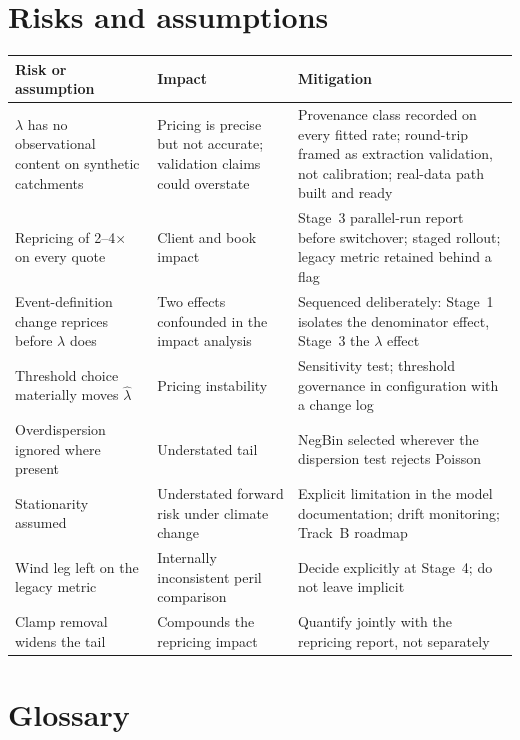 \documentclass[11pt]{article}
\begin{document}
\section{Risks and assumptions}

\begin{longtable}{@{}p{}p{}p{}@{}}
\toprule
\textbf{Risk or assumption} & \textbf{Impact} & \textbf{Mitigation} \\
\midrule
\endhead
$\lambda$ has no observational content on synthetic catchments & Pricing is
precise but not accurate; validation claims could overstate & Provenance class
recorded on every fitted rate; round-trip framed as extraction validation, not
calibration; real-data path built and ready \\
\addlinespace
Repricing of 2--4$\times$ on every quote & Client and book impact & Stage~3
parallel-run report before switchover; staged rollout; legacy metric retained
behind a flag \\
\addlinespace
Event-definition change reprices before $\lambda$ does & Two effects confounded
in the impact analysis & Sequenced deliberately: Stage~1 isolates the
denominator effect, Stage~3 the $\lambda$ effect \\
\addlinespace
Threshold choice materially moves $\hat{\lambda}$ & Pricing instability &
Sensitivity test; threshold governance in configuration with a change log \\
\addlinespace
Overdispersion ignored where present & Understated tail & NegBin selected
wherever the dispersion test rejects Poisson \\
\addlinespace
Stationarity assumed & Understated forward risk under climate change & Explicit
limitation in the model documentation; drift monitoring; Track~B roadmap \\
\addlinespace
Wind leg left on the legacy metric & Internally inconsistent peril comparison &
Decide explicitly at Stage~4; do not leave implicit \\
\addlinespace
Clamp removal widens the tail & Compounds the repricing impact & Quantify
jointly with the repricing report, not separately \\
\bottomrule
\end{longtable}

\section{Glossary}
\end{document}
